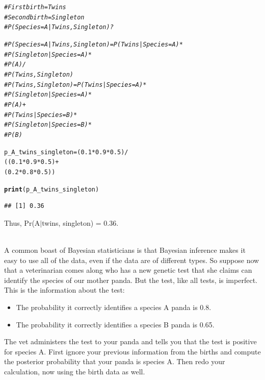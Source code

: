 \documentclass[12pt]{article}\usepackage[]{graphicx}\usepackage[]{color}
\makeatletter
\newcommand{\hlnum}[1]{\textcolor[rgb]{0.686,0.059,0.569}{#1}}%
\newcommand{\hlcom}[1]{\textcolor[rgb]{0.678,0.584,0.686}{\textit{#1}}}%
\newcommand{\hlopt}[1]{\textcolor[rgb]{0,0,0}{#1}}%
\newcommand{\hlstd}[1]{\textcolor[rgb]{0.345,0.345,0.345}{#1}}%
\newcommand{\hlkwb}[1]{\textcolor[rgb]{0.69,0.353,0.396}{#1}}%
\newcommand{\hlkwd}[1]{\textcolor[rgb]{0.737,0.353,0.396}{\textbf{#1}}}%
\newenvironment{kframe}{%
 \def\at@end@of@kframe{}%
 \ifinner\ifhmode%
  \def\at@end@of@kframe{\end{minipage}}%
  \begin{minipage}{\columnwidth}%
 \fi\fi%
 \def\FrameCommand##1{\hskip\@totalleftmargin \hskip-\fboxsep
 \colorbox{shadecolor}{##1}\hskip-\fboxsep
     \hskip-\linewidth \hskip-\@totalleftmargin \hskip\columnwidth}%
 \MakeFramed {\advance\hsize-\width
   \@totalleftmargin\z@ \linewidth\hsize
   \@setminipage}}%
 {\par\unskip\endMakeFramed%
 \at@end@of@kframe}
\newenvironment{knitrout}{}{} %
\newenvironment{problem}[2][Problem]{\begin{trivlist}
\item[\hskip \labelsep {\bfseries #1}\hskip \labelsep {\bfseries #2.}]}{\end{trivlist}}
\makeatother
\begin{document}
\begin{knitrout}
\color{fgcolor}\begin{kframe}
\begin{alltt}
\hlcom{# First birth = Twins}
\hlcom{# Second birth = Singleton}
\hlcom{# P(Species = A| Twins, Singleton)?}

\hlcom{# P(Species = A | Twins, Singleton) = P(Twins | Species = A) *}
\hlcom{#                                   P(Singleton | Species = A) *}
\hlcom{#                                      P(A) /}
\hlcom{#                                         P(Twins,Singleton)}
\hlcom{# P(Twins,Singleton) =  P(Twins | Species = A) *}
\hlcom{#                       P(Singleton | Species = A) *}
\hlcom{#                          P(A) +}
\hlcom{#                    P(Twins | Species = B) *}
\hlcom{#                       P(Singleton | Species = B) *}
\hlcom{#                          P(B)}

\hlstd{p_A_twins_singleton} \hlkwb{=} \hlstd{(} \hlnum{0.1} \hlopt{*} \hlnum{0.9} \hlopt{*} \hlnum{0.5}\hlstd{)} \hlopt{/}
                      \hlstd{((} \hlnum{0.1} \hlopt{*} \hlnum{0.9} \hlopt{*} \hlnum{0.5}\hlstd{)} \hlopt{+}
                            \hlstd{(} \hlnum{0.2} \hlopt{*} \hlnum{0.8} \hlopt{*} \hlnum{0.5} \hlstd{))}

\hlkwd{print}\hlstd{(p_A_twins_singleton)}
\end{alltt}
\begin{verbatim}
## [1] 0.36
\end{verbatim}
\end{kframe}
\end{knitrout}

Thus, Pr(A$\vert$twins, singleton) = 0.36.

\begin{problem}{2H4}
\text{}\\
A common boast of Bayesian statisticians is that Bayesian inference makes it easy to use all of the data, even if the data are of different types.
So suppose now that a veterinarian comes along who has a new genetic test that she claims can identify the species of our mother panda. But the test, like all tests, is imperfect. This is the information about the test:
\begin{itemize}
  \item The probability it correctly identifies a species A panda is 0.8.
  \item The probability it correctly identifies a species B panda is 0.65.
\end{itemize}
The vet administers the test to your panda and tells you that the test is positive for species A. First ignore your previous information from the births and compute the posterior probability that your panda is species A. Then redo your calculation, now using the birth data as well.
\end{problem}
\end{document}
